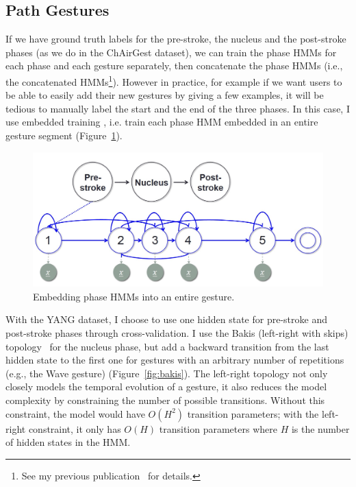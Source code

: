 \subsection{Path Gestures}
If we have ground truth labels for the pre-stroke, the nucleus and the
post-stroke phases (as we do in the ChAirGest dataset), we can train the
phase HMMs for each phase and each gesture separately, then concatenate the
phase HMMs (i.e., the concatenated HMMs\footnote{See my previous
publication~\cite{yin13} for details.}).
However in practice, for example if we want users to be able to easily add their new gestures by giving a few
examples, it will be tedious to manually label the start and the end of the
three phases. In this case, I use embedded training \cite{young1994}, i.e.
train each phase HMM embedded in an entire gesture segment
(Figure~\ref{fig:embed}).

\begin{figure}[tbh]
\centering
\includegraphics[width=0.7\columnwidth]{figures/embedded.jpg}
\caption{Embedding phase HMMs into an entire gesture.}
\label{fig:embed}
\end{figure}

With the YANG dataset, I choose to use one hidden state for pre-stroke and
post-stroke phases through cross-validation. I use the Bakis (left-right with
skips) topology~\cite{Bauer00} for the nucleus phase, but add a backward
transition from the last hidden state to the first one for gestures with an
arbitrary number of repetitions (e.g., the Wave gesture)
(Figure~\ref{fig:bakis}). The left-right topology not only closely models the temporal evolution of a gesture, it also reduces the model complexity
by constraining the number of possible transitions. Without this constraint,
the model would have $O(H^2)$ transition parameters; with the left-right
constraint, it only has $O(H)$ transition parameters where $H$ is the
number of hidden states in the HMM.

